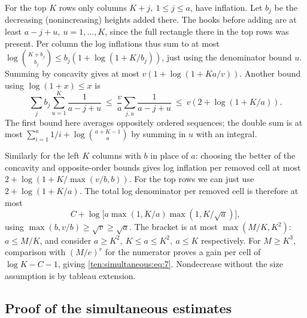 For the top \(K\) rows only columns \(K+j,\ 1\le j\le a\), have inflation. Let \(b_j\) be the decreasing (nonincreasing) heights added there. The hooks before adding are at least \(a-j+u,\ u=1,\ldots,K\), since the full rectangle there in the top rows was present. Per column the log inflations thus sum to at most \(\log\binom{K+b_j}{b_j}\le b_j(1+\log(1+K/b_j))\), just using the denominator bound \(u\). Summing by concavity gives at most \(v(1+\log(1+Ka/v))\). Another bound using \(\log(1+x)\le x\) is
\[
 \sum_j b_j\sum_{u=1}^K\frac1{a-j+u}
 \ \le\ \frac va\sum_{j,u}\frac1{a-j+u}
 \ \le\ v(2+\log(1+K/a)).
\]
The first bound here averages oppositely ordered sequences; the double sum is at most \(\sum_{i=1}^a 1/i+\log\binom{a+K-1}{a}\) by summing in \(u\) with an integral.

Similarly for the left \(K\) columns with \(b\) in place of \(a\): choosing the better of the concavity and opposite-order bounds gives log inflation per removed cell at most \(2+\log(1+K/\max(v/b,b))\). For the top rows we can just use \(2+\log(1+K/a)\). The total log denominator per removed cell is therefore at most
\[
 C+\log\!\big[ a \max(1,K/a)\max(1,K/\sqrt a)\big],
\]
using \(\max(b,v/b)\ge\sqrt v\ge\sqrt a\). The bracket is at most \(\max(M/K,K^2)\): \(a\le M/K\), and consider \(a\ge K^2,\ K\le a\le K^2,\ a\le K\) respectively. For \(M\ge K^3\), comparison with \((M/e)^v\) for the numerator proves a gain per cell of \(\log K-C-1\), giving \eqref{ten:simultaneous:eq:7}. Nondecrease without the size assumption is by tableau extension.

\subsection{Proof of the simultaneous estimates}

